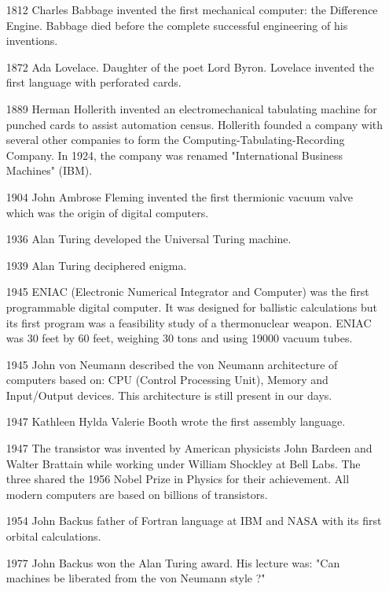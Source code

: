  \begin{itemize} 
 \setlength\itemsep{0cm}
 \item[1812] Charles Babbage invented the first mechanical computer: the Difference Engine.
 Babbage died before the complete successful engineering of his inventions. 
 \item[1872]  Ada Lovelace. Daughter of the poet Lord Byron. Lovelace invented the first language with perforated cards. 
 \item[1889]   Herman Hollerith invented an electromechanical tabulating machine for punched cards 
 to assist automation census. Hollerith founded a company with several other companies to form the 
 Computing-Tabulating-Recording Company. In 1924, the company was renamed 
 "International Business Machines" (IBM). 
 \item[1904] John Ambrose Fleming invented the first thermionic  vacuum valve which was the origin
 of digital computers.  
 \item[1936] Alan Turing developed the  Universal Turing machine. 
 \item[1939] Alan Turing deciphered enigma. 
 \item[1945]
 ENIAC (Electronic Numerical Integrator and Computer) was the first programmable digital computer. 
 It was designed for ballistic calculations but its first program was a feasibility study 
 of a thermonuclear weapon.
 ENIAC was 30 feet by 60 feet, weighing 30 tons and using 19000 vacuum tubes.
 
 \item[1945]  John von Neumann described the von Neumann architecture of computers based on: 
 CPU (Control Processing Unit), Memory and Input/Output devices. 
 This architecture is still present in our days.
   
 
 
 \item[1947]  Kathleen Hylda Valerie Booth wrote the first assembly language.
 
 \item [1947] 
 The  transistor was invented by American physicists John Bardeen and Walter  Brattain 
 while working under William Shockley at Bell Labs. 
 The three shared the 1956 Nobel Prize in Physics for their achievement. All modern computers
 are based on billions of transistors. 
   
 
 \item[1954]  John Backus father of Fortran language at IBM and NASA 
 with its first orbital calculations.
 \item[1977]  John Backus won the Alan Turing award. 
  His lecture was: "Can machines be liberated from the von Neumann style ?" 
  \end{itemize}      
  
